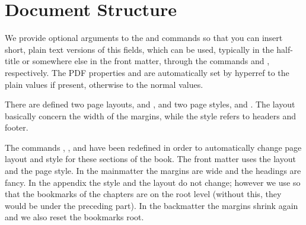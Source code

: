 \section{Document Structure}

We provide optional arguments to the  and 
 commands so that you can insert short, plain text 
versions of this fields, which can be used, typically in the half-title 
or somewhere else in the front matter, through the commands 
 and , respectively. The PDF 
properties  and  are automatically 
set by hyperref to the plain values if present, otherwise to the normal 
values.

There are defined two page layouts,  and , 
and two page styles,  and . The layout 
basically concern the width of the margins, while the style refers to 
headers and footer. 

The commands , , and 
 have been redefined in order to automatically 
change page layout and style for these sections of the book. The front 
matter uses the  layout and the  page 
style. In the mainmatter the margins are wide and the headings are 
fancy. In the appendix the style and the layout do not change; however 
we use  so that the bookmarks of 
the chapters are on the root level (without this, they would be under 
the preceding part). In the backmatter the margins shrink again and we 
also reset the bookmarks root.
